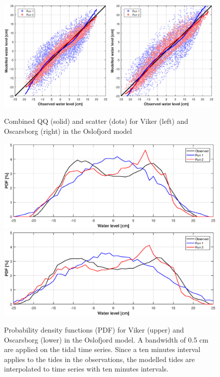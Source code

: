 \begin{figure}[!t]
\centering
\includegraphics[width=0.49\textwidth]{fig_Viker_QQ_Scatter}
\includegraphics[width=0.49\textwidth]{fig_Oscarsborg_QQ_Scatter}
\caption{Combined QQ (solid) and scatter (dots) for Viker (left) and Oscarsborg (right) in the Oslofjord model}
\label{fig:Oslo_QQ_Scatter}
\end{figure}

\begin{figure}[!t]
\centering
\includegraphics[width=\textwidth]{fig_Viker_PDF}
\includegraphics[width=\textwidth]{fig_Oscarsborg_PDF}
\caption{Probability density functions (PDF) for Viker (upper) and Oscarsborg (lower) in the Oslofjord model. A bandwidth of 0.5 cm are applied on the tidal time series. Since a ten minutes interval applies to the tides in the observations, the modelled tides are interpolated to time series with ten minutes intervals.}
\label{fig:Oslo_PDF}
\end{figure}


